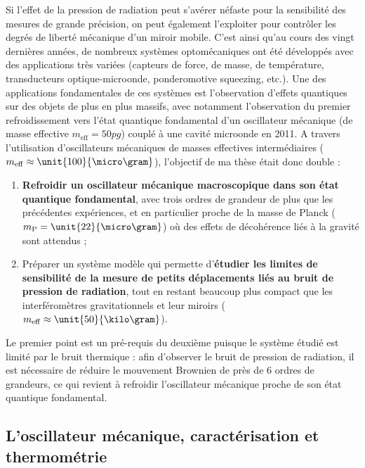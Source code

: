 \documentclass[12pt,a4paper]{article}
\begin{document}
Si l'effet de la pression de radiation peut s'avérer néfaste pour la sensibilité des mesures de grande précision, on peut également l'exploiter pour contrôler les degrés de liberté mécanique d'un miroir mobile.
C'est ainsi qu'au cours des vingt dernières années, de nombreux systèmes optomécaniques ont été développés avec des applications très variées (capteurs de force, de masse, de température, transducteurs optique-microonde, ponderomotive squeezing, etc.).
Une des applications fondamentales de ces systèmes est l'observation d'effets quantiques sur des objets de plus en plus massifs, avec notamment l'observation du premier refroidissement vers l'état quantique fondamental d'un oscillateur mécanique (de masse effective $m_\mathrm{eff} = \unit{50}{pg}$) couplé à une cavité microonde en 2011.
A travers l'utilisation d'oscillateurs mécaniques de masses effectives intermédiaires ($m_\mathrm{eff} \approx \unit{100}{\micro\gram}$), l'objectif de ma thèse était donc double :
\begin{enumerate}
\item \textbf{Refroidir un oscillateur mécanique macroscopique dans son état quantique fondamental}, avec trois ordres de grandeur de plus que les précédentes expériences, et en particulier proche de la masse de Planck ($m_\mathrm{P}=\unit{22}{\micro\gram}$) où des effets de décohérence liés à la gravité sont attendus ;
\item Préparer un système modèle qui permette d'\textbf{étudier les limites de sensibilité de la mesure de petits déplacements liés au bruit de pression de radiation}, tout en restant beaucoup plus compact que les interféromètres gravitationnels et leur miroirs ($m_\mathrm{eff}\approx\unit{50}{\kilo\gram}$).
\end{enumerate}
Le premier point est un pré-requis du deuxième puisque le système étudié est limité par le bruit thermique : afin d'observer le bruit de pression de radiation, il est nécessaire de réduire le mouvement Brownien de près de 6 ordres de grandeurs, ce qui revient à refroidir l'oscillateur mécanique proche de son état quantique fondamental.

\subsection{L'oscillateur mécanique, caractérisation et thermométrie}
\end{document}
